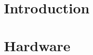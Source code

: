 \section{Introduction}
\label{hardware:Introduction}


\section{Hardware}
\label{hardware:hardware}
